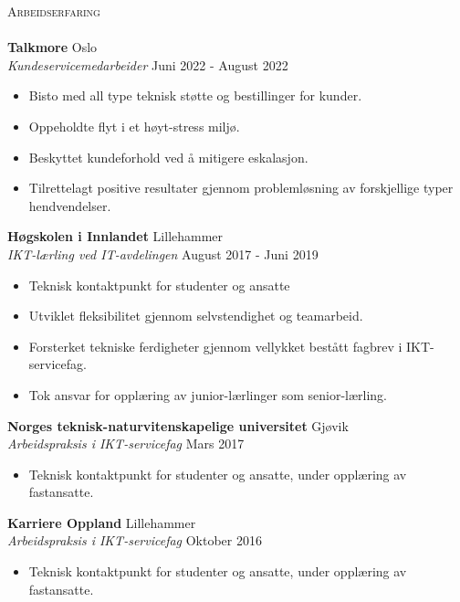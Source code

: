 \documentclass[a4paper]{article}
\newcommand{\lineunder} {
    \vspace*{-8pt} \\
    \hspace*{-18pt} \hrulefill \\
}
\newcommand{\header} [1] {
    {\hspace*{-18pt}\vspace*{6pt} \textsc{#1}}
    \vspace*{-6pt} \lineunder
}
\begin{document}
\header{Arbeidserfaring}
\vspace{1mm}
\textbf{Talkmore} \hfill Oslo\\
\textit{Kundeservicemedarbeider} \hfill Juni 2022 - August 2022\\
\vspace{-1mm}
\begin{itemize} \itemsep 1pt
    \item Bisto med all type teknisk støtte og bestillinger for kunder.
    \item Oppeholdte flyt i et høyt-stress miljø.
	\item Beskyttet kundeforhold ved å mitigere eskalasjon.
    \item Tilrettelagt positive resultater gjennom problemløsning av forskjellige typer hendvendelser.
\end{itemize}
\textbf{Høgskolen i Innlandet} \hfill Lillehammer\\
\textit{IKT-lærling ved IT-avdelingen} \hfill August 2017 - Juni 2019\\
\vspace{-1mm}
\begin{itemize} \itemsep 1pt
	\item Teknisk kontaktpunkt for studenter og ansatte 
	\item Utviklet fleksibilitet gjennom selvstendighet og teamarbeid.
	\item Forsterket tekniske ferdigheter gjennom vellykket bestått fagbrev i IKT-servicefag.
    \item Tok ansvar for opplæring av junior-lærlinger som senior-lærling.
\end{itemize}
\textbf{Norges teknisk-naturvitenskapelige universitet} \hfill Gjøvik\\
\textit{Arbeidspraksis i IKT-servicefag} \hfill Mars 2017\\
\vspace{-1mm}
\begin{itemize} \itemsep 1pt
	\item Teknisk kontaktpunkt for studenter og ansatte, under opplæring av fastansatte. 
\end{itemize}
\textbf{Karriere Oppland} \hfill Lillehammer\\
\textit{Arbeidspraksis i IKT-servicefag} \hfill Oktober 2016\\
\begin{itemize} \itemsep 1pt
	\item Teknisk kontaktpunkt for studenter og ansatte, under opplæring av fastansatte.  
\end{itemize}
\end{document}

